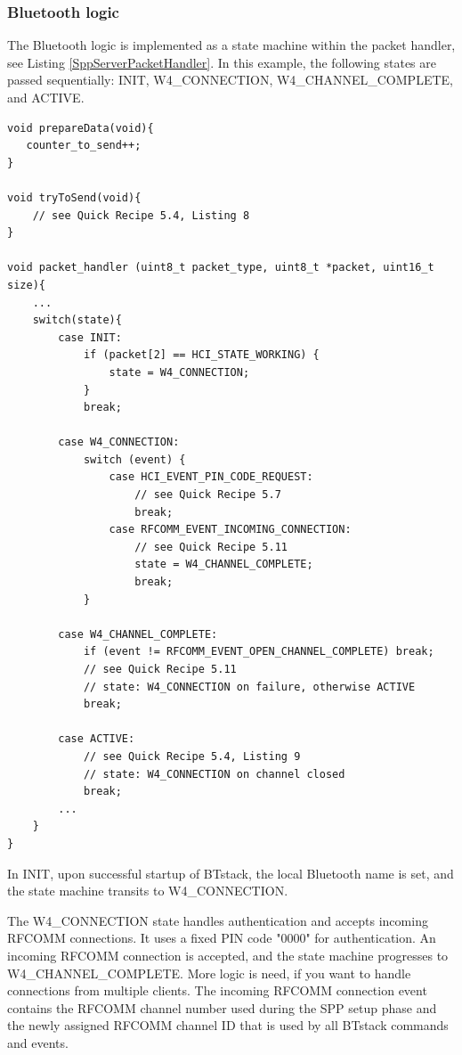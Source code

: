 \documentclass[a4paper,titlepage,oneside,12pt]{amsart} %
\begin{document}
\subsubsection{Bluetooth logic}
The Bluetooth logic is implemented as a state machine within the packet handler, see Listing \ref{SppServerPacketHandler}. In this example, the following states are passed sequentially: INIT, W4\_CONNECTION, W4\_CHANNEL\_COMPLETE, and ACTIVE.

\begin{lstlisting}[float, caption=SPP Server - Heartbeat Counter over RFCOMM., label=SppServerPacketHandler]
void prepareData(void){
   counter_to_send++;
}

void tryToSend(void){
    // see Quick Recipe 5.4, Listing 8
}

void packet_handler (uint8_t packet_type, uint8_t *packet, uint16_t size){
    ...    
    switch(state){
        case INIT:
            if (packet[2] == HCI_STATE_WORKING) {
                state = W4_CONNECTION;
            }
            break;

        case W4_CONNECTION:
            switch (event) {
                case HCI_EVENT_PIN_CODE_REQUEST:
                    // see Quick Recipe 5.7
                    break;
                case RFCOMM_EVENT_INCOMING_CONNECTION:
                    // see Quick Recipe 5.11
                    state = W4_CHANNEL_COMPLETE;
                    break;
            }
        
        case W4_CHANNEL_COMPLETE:
            if (event != RFCOMM_EVENT_OPEN_CHANNEL_COMPLETE) break;
            // see Quick Recipe 5.11
            // state: W4_CONNECTION on failure, otherwise ACTIVE
            break;
        
        case ACTIVE:
            // see Quick Recipe 5.4, Listing 9
            // state: W4_CONNECTION on channel closed
            break;
        ...
    }
}
\end{lstlisting}

In INIT, upon successful startup of BTstack, the local Bluetooth name is set, and the state machine transits to W4\_CONNECTION.

The W4\_CONNECTION state handles authentication and accepts incoming RFCOMM connections. It uses a fixed PIN code "0000" for authentication. An incoming RFCOMM  connection is accepted, and the state machine progresses to W4\_CHANNEL\_COMPLETE.  More logic is need, if you want to handle connections from multiple clients. The incoming RFCOMM connection event contains the RFCOMM channel number used during the SPP setup phase and the newly assigned RFCOMM channel ID that is used by all BTstack commands and events. 
\end{document}
